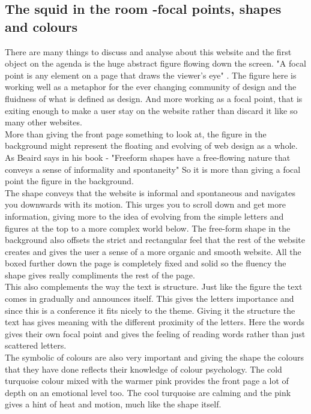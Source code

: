 \documentclass{article}
\begin{document}
	    \subsection{The squid in the room -focal points, shapes and colours}
		    There are many things to discuss and analyse about this website and the first object on the agenda is the huge abstract figure flowing down the screen. "A focal point is any element on a page that draws the viewer’s eye" \citep[Page. 22]{PWebDesign}. The figure here is working well as a metaphor for the ever changing community of design and the fluidness of what is defined as design. And more working as a focal point, that is exiting enough to make a user stay on the website rather than discard it like so many other websites. \\More than giving the front page something to look at, the figure in the background might represent the floating and evolving of web design as a whole. As Beaird says in his book - "Freeform shapes have a free-flowing nature that conveys a sense of informality and spontaneity"\citep[Page. 86]{PWebDesign} So it is more than giving a focal point the figure in the background.\\ The shape conveys that the website is informal and spontaneous and navigates you downwards with its motion. This urges you to scroll down and get more information, giving more to the idea of evolving from the simple letters and figures at the top to a more complex world below. The free-form shape in the background also offsets the strict and rectangular feel that the rest of the website creates and gives the user a sense of a more organic and smooth website. All the boxed further down the page is completely fixed and solid so the fluency the shape gives really compliments the rest of the page. \\This also complements the way the text is structure. Just like the figure the text comes in gradually and announces itself. This gives the letters importance and since this is a conference it fits nicely to the theme. Giving it the structure the text has gives meaning with the different proximity of the letters. Here the words gives their own focal point and gives the feeling of reading words rather than just scattered letters.\\
            The symbolic of colours are also very important and giving the shape the colours that they have done reflects their knowledge of colour psychology. The cold turquoise colour mixed with the warmer pink provides the front page a lot of depth on an emotional level too. The cool turquoise are calming and the pink gives a hint of heat and motion, much like the shape itself. \citep[Page. 50]{PWebDesign} 
\end{document}
